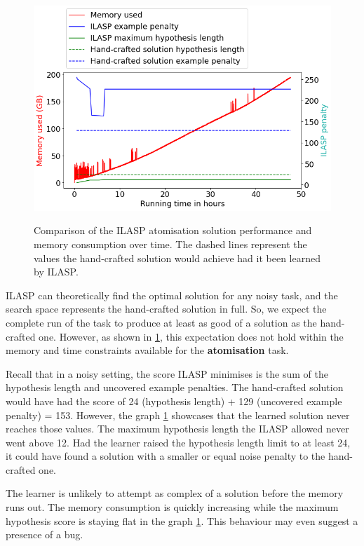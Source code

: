 \begin{figure}[h]
\caption{Comparison of the ILASP atomisation solution performance and memory consumption over time. The dashed lines represent the values the hand-crafted solution would achieve had it been learned by ILASP.} 
\centering
\includegraphics[width=\textwidth]{solving-nlp-tasks-logically/atomisation_memory_vs_best_score.png}
\label{atomisation-memory-graph}
\end{figure}

ILASP can theoretically find the optimal solution for any noisy task, and the search space represents the hand-crafted solution in full. 
So, we expect the complete run of the task to produce at least as good of a solution as the hand-crafted one.
However, as shown in \ref{atomisation-memory-graph}, this expectation does not hold within the memory and time constraints available for the \textbf{atomisation} task.

Recall that in a noisy setting, the score ILASP minimises is the sum of the hypothesis length and uncovered example penalties.
The hand-crafted solution would have had the score of 24 (hypothesis length) + 129 (uncovered example penalty) = 153.
However, the graph \ref{atomisation-memory-graph} showcases that the learned solution never reaches those values.
The maximum hypothesis length the ILASP allowed never went above 12. 
Had the learner raised the hypothesis length limit to at least 24, it could have found a solution with a smaller or equal noise penalty to the hand-crafted one.

The learner is unlikely to attempt as complex of a solution before the memory runs out. 
The memory consumption is quickly increasing while the maximum hypothesis score is staying flat in the graph \ref{atomisation-memory-graph}.
This behaviour may even suggest a presence of a bug.

